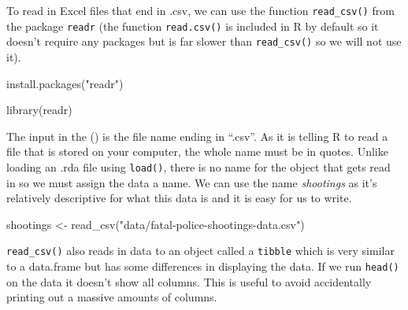 \documentclass[
]{krantz}
\makeatletter
\newenvironment{Shaded}{\begin{snugshade}}{\end{snugshade}}
\newcommand{\FunctionTok}[1]{\textcolor[rgb]{0,0,0}{#1}}
\newcommand{\NormalTok}[1]{#1}
\newcommand{\OtherTok}[1]{\textcolor[rgb]{0.37,0.37,0.37}{#1}}
\newcommand{\StringTok}[1]{\textcolor[rgb]{0.5,0.5,0.5}{#1}}
\newenvironment{kframe}{%
\medskip{}
\setlength{\fboxsep}{.8em}
 \def\at@end@of@kframe{}%
 \ifinner\ifhmode%
  \def\at@end@of@kframe{\end{minipage}}%
  \begin{minipage}{\columnwidth}%
 \fi\fi%
 \def\FrameCommand##1{\hskip\@totalleftmargin \hskip-\fboxsep
 \colorbox{shadecolor}{##1}\hskip-\fboxsep
     \hskip-\linewidth \hskip-\@totalleftmargin \hskip\columnwidth}%
 \MakeFramed {\advance\hsize-\width
   \@totalleftmargin\z@ \linewidth\hsize
   \@setminipage}}%
 {\par\unskip\endMakeFramed%
 \at@end@of@kframe}
\renewenvironment{Shaded}{\begin{kframe}}{\end{kframe}}
\makeatother
\begin{document}
To read in Excel files that end in .csv, we can use the
function \texttt{read\_csv()} from the package
\texttt{readr} (the function \texttt{read.csv()} is included
in R by default so it doesn't require any packages but is
far slower than \texttt{read\_csv()} so we will not use it).

\begin{Shaded}
\begin{Highlighting}[]
\FunctionTok{install.packages}\NormalTok{(}\StringTok{"readr"}\NormalTok{)}
\end{Highlighting}
\end{Shaded}

\begin{Shaded}
\begin{Highlighting}[]
\FunctionTok{library}\NormalTok{(readr)}
\end{Highlighting}
\end{Shaded}

The input in the () is the file name ending in ``.csv''. As
it is telling R to read a file that is stored on your
computer, the whole name must be in quotes. Unlike loading
an .rda file using \texttt{load()}, there is no name for the
object that gets read in so we must assign the data a name.
We can use the name \emph{shootings} as it's relatively
descriptive for what this data is and it is easy for us to
write.

\begin{Shaded}
\begin{Highlighting}[]
\NormalTok{shootings }\OtherTok{\textless{}{-}} \FunctionTok{read\_csv}\NormalTok{(}\StringTok{"data/fatal{-}police{-}shootings{-}data.csv"}\NormalTok{)}
\end{Highlighting}
\end{Shaded}

\texttt{read\_csv()} also reads in data to an object called
a \texttt{tibble} which is very similar to a data.frame but
has some differences in displaying the data. If we run
\texttt{head()} on the data it doesn't show all columns.
This is useful to avoid accidentally printing out a massive
amounts of columns.
\end{document}
